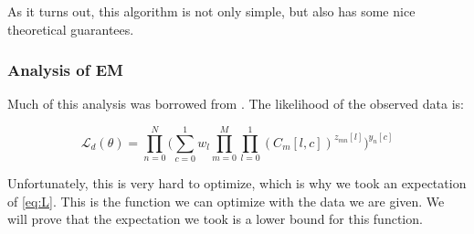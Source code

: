 As it turns out, this algorithm is not only simple, but also has some nice
theoretical guarantees.

\subsubsection{Analysis of EM}
Much of this analysis was borrowed from \cite{murphy2012machine}. The likelihood
of the observed data is:

\begin{equation}  \label{eq:observedL}
\mathcal{L}_{d}(\theta) =
\displaystyle\prod\limits_{n=0}^{N} \Big ( \displaystyle\sum\limits_{c=0}^{1}
w_{l} \displaystyle\prod\limits_{m=0}^{M} \displaystyle\prod\limits_{l=0}^{1} (C_{m}[l,c])^{z_{mn}[l]} \Big )^{y_{n}[c]}
\end{equation}

Unfortunately, this is very hard to optimize, which is why we took an
expectation of \eqref{eq:L}. This is the function we can optimize with the data
we are given. We will prove that the expectation we took is a lower bound for
this function.

